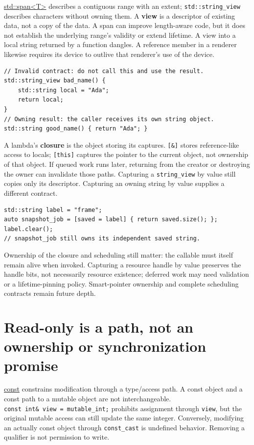 \hyperref[appendix-aea529eb5175]{std::span\textless T\textgreater{}} describes a contiguous range with an extent; \texttt{std::string\_view} describes characters without owning them. A \textbf{view} is a descriptor of existing data, not a copy of the data. A span can improve length-aware code, but it does not establish the underlying range's validity or extend lifetime. A view into a local string returned by a function dangles. A reference member in a renderer likewise requires its device to outlive that renderer's use of the device.

\begin{verbatim}
// Invalid contract: do not call this and use the result.
std::string_view bad_name() {
    std::string local = "Ada";
    return local;
}
// Owning result: the caller receives its own string object.
std::string good_name() { return "Ada"; }
\end{verbatim}

A lambda's \textbf{closure} is the object storing its captures. \texttt{{[}\&{]}} stores reference-like access to locals; \texttt{{[}this{]}} captures the pointer to the current object, not ownership of that object. If queued work runs later, returning from the creator or destroying the owner can invalidate those paths. Capturing a \texttt{string\_view} by value still copies only its descriptor. Capturing an owning string by value supplies a different contract.

\begin{verbatim}
std::string label = "frame";
auto snapshot_job = [saved = label] { return saved.size(); };
label.clear();
// snapshot_job still owns its independent saved string.
\end{verbatim}

Ownership of the closure and scheduling still matter: the callable must itself remain alive when invoked. Capturing a resource handle by value preserves the handle bits, not necessarily resource existence; deferred work may need validation or a lifetime-pinning policy. Smart-pointer ownership and complete scheduling contracts remain future depth.

\section{Read-only is a path, not an ownership or synchronization promise}\label{01-foundations-i-ch003-read-only-is-a-path-not-an-ownership-or-synchronization-promise}

\hyperref[appendix-c25d60fed375]{const} constrains modification through a type/access path. A const object and a const path to a mutable object are not interchangeable. \texttt{const\ int\&\ view\ =\ mutable\_int;} prohibits assignment through \texttt{view}, but the original mutable access can still update the same integer. Conversely, modifying an actually const object through \texttt{const\_cast} is undefined behavior. Removing a qualifier is not permission to write.

